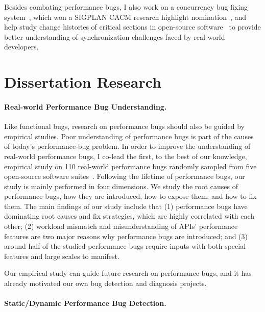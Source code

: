 \documentclass[10pt]{article}
\begin{document}
Besides combating performance bugs, 
I also work on a concurrency bug fixing system~\cite{jin11afix}, 
which won a SIGPLAN CACM research highlight nomination~\cite{afixnom}, 
and help study change histories of critical sections in open-source software~\cite{Gu15FSE} 
to provide better understanding of synchronization challenges faced by real-world developers.



\section{Dissertation Research}

\paragraph{Real-world Performance Bug Understanding.}
Like functional bugs, research on performance bugs should also be guided by empirical studies. 
Poor understanding of performance bugs is part of the causes of today's performance-bug problem. 
In order to improve the understanding of real-world performance bugs, 
I co-lead the first, to the best of our knowledge, 
empirical study on 110 real-world performance bugs randomly sampled from five open-source software suites~\cite{jin12perfbug}. 
Following the lifetime of performance bugs, 
our study is mainly performed in four dimensions. 
We study the root causes of performance bugs, 
how they are introduced, how to expose them, and how to fix them. 
The main findings of our study include that 
(1) performance bugs have dominating root causes and fix strategies, which are highly correlated with each other; 
(2) workload mismatch and misunderstanding of APIs' performance features are two major reasons why performance bugs are introduced; 
and (3) around half of the studied performance bugs require inputs with both special features and large scales to manifest. 

Our empirical study can guide future research on performance bugs, 
and it has already motivated our own bug detection and diagnosis projects.

\paragraph{Static/Dynamic Performance Bug Detection.}
\end{document}
